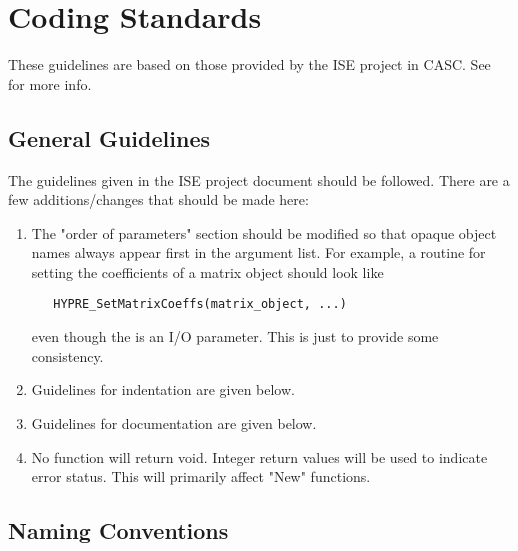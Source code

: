 \chapter{Coding Standards}
\label{Coding Standards}

These guidelines are based on those provided by the ISE project in
CASC.  See
for more info.

\section{General Guidelines}
\label{General Guidelines}

The guidelines given in the ISE project document 
should be followed.  There are a few additions/changes that should
be made here:
\begin{enumerate}

\item The "order of parameters" section should be modified so that
opaque object names always appear first in the argument list.  For
example, a routine for setting the coefficients of a matrix object
should look like
\begin{verbatim}
   HYPRE_SetMatrixCoeffs(matrix_object, ...)
\end{verbatim}
even though the  is an I/O parameter.  This is just to
provide some consistency.

\item Guidelines for indentation are given below.

\item Guidelines for documentation are given below.

\item No function will return void.  Integer return values will be used
to indicate error status.  This will primarily affect "New" functions.

\end{enumerate}

\section{Naming Conventions}
\label{Naming Conventions}

